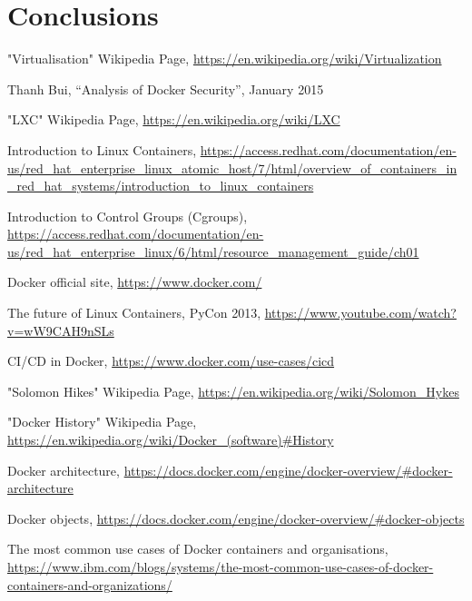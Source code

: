 \documentclass[a4paper,12pt]{article}
\begin{document}
\newpage

\section{Conclusions}

\newpage

\begin{thebibliography}{99}

"Virtualisation" Wikipedia Page,
\url{https://en.wikipedia.org/wiki/Virtualization}

Thanh Bui, ``Analysis of Docker Security'', January 2015

"LXC" Wikipedia Page, \url{https://en.wikipedia.org/wiki/LXC}

Introduction to Linux Containers,
\url{https://access.redhat.com/documentation/en-us/red_hat_enterprise_linux_atomic_host/7/html/overview_of_containers_in_red_hat_systems/introduction_to_linux_containers}
  
Introduction to Control Groups (Cgroups),
\url{https://access.redhat.com/documentation/en-us/red_hat_enterprise_linux/6/html/resource_management_guide/ch01}

Docker official site, \url{https://www.docker.com/}

The future of Linux Containers, PyCon 2013,
\url{https://www.youtube.com/watch?v=wW9CAH9nSLs}

CI/CD in Docker, \url{https://www.docker.com/use-cases/cicd}

"Solomon Hikes" Wikipedia Page,
\url{https://en.wikipedia.org/wiki/Solomon_Hykes}

"Docker History" Wikipedia Page,
\url{https://en.wikipedia.org/wiki/Docker_(software)#History}

Docker architecture,
\url{https://docs.docker.com/engine/docker-overview/#docker-architecture}

Docker objects,
\url{https://docs.docker.com/engine/docker-overview/#docker-objects}

The most common use cases of Docker containers and organisations,
\url{https://www.ibm.com/blogs/systems/the-most-common-use-cases-of-docker-containers-and-organizations/}


\end{thebibliography}
\end{document}
